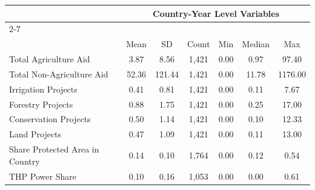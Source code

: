 {
\def\sym#1{\ifmmode^{#1}\else\(^{#1}\)\fi}
\begin{tabular}{l*{1}{cccccc}}
\toprule
     &\multicolumn{6}{c}{Country-Year Level Variables}                             \\\cmidrule(lr){2-7}
     &\multicolumn{6}{c}{}                                                         \\
     &        Mean&          SD&       Count&         Min&      Median&         Max\\
\midrule
Total Agriculture Aid&        3.87&        8.56&       1,421&        0.00&        0.97&       97.40\\
Total Non-Agriculture Aid&       52.36&      121.44&       1,421&        0.00&       11.78&     1176.00\\
Irrigation Projects&        0.41&        0.81&       1,421&        0.00&        0.11&        7.67\\
Forestry Projects&        0.88&        1.75&       1,421&        0.00&        0.25&       17.00\\
Conservation Projects&        0.50&        1.14&       1,421&        0.00&        0.10&       12.33\\
Land Projects&        0.47&        1.09&       1,421&        0.00&        0.11&       13.00\\
Share Protected Area in Country&        0.14&        0.10&       1,764&        0.00&        0.12&        0.54\\
THP Power Share&        0.10&        0.16&       1,053&        0.00&        0.00&        0.61\\
\bottomrule
\end{tabular}
}
